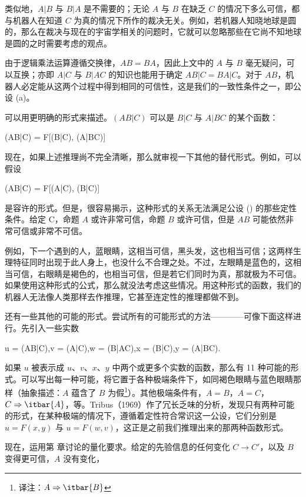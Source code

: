 类似地，$A|B$ 与 $B|A$ 是不需要的；无论 $A$ 与 $B$ 在缺乏 $C$ 的情况下多么可信，都与机器人在知道 $C$ 为真的情况下所作的裁决无关。例如，若机器人知晓地球是圆的，那么在裁决与现在的宇宙学相关的问题时，它就可以忽略那些在它尚不知地球是圆的之时需要考虑的观点。

由于逻辑乘法运算遵循交换律，$AB = BA$，因此上文中的 $A$ 与 $B$ 毫无疑问，可以互换；亦即 $A|C$ 与 $B|AC$ 的知识也能用于确定 $AB|C = BA|C$。对于 $AB$，机器人必定能从这两个过程中得到相同的可信性，这是我们的一致性条件之一，即公设 (a)。

可以用更明确的形式来描述。$(AB|C)$ 可以是 $B|C$ 与 $A|BC$ 的某个函数：

\startformula
(AB|C) = F[(B|C), (A|BC)]
\stopformula

现在，如果上述推理尚不完全清晰，那么就审视一下其他的替代形式。例如，可以假设

\placeformula
\startformula
(AB|C) = F[(A|C), (B|C)]
\stopformula

是容许的形式。但是，很容易揭示，这种形式的关系无法满足公设 () 的那些定性条件。给定 C，命题 $A$ 或许非常可信，命题 $B$ 或许可信，但是 $AB$ 可能依然非常可信或非常不可信。

例如，下一个遇到的人，蓝眼睛，这相当可信，黑头发，这也相当可信；这两样生理特征同时出现于此人身上，也没什么不合理之处。不过，左眼睛是蓝色的，这相当可信，右眼睛是褐色的，也相当可信，但是若它们同时为真，那就极为不可信。如果使用这种形式的公式，那么就没法考虑这些情况。用这种形式的函数，我们的机器人无法像人类那样去作推理，它甚至连定性的推理都做不到。

还有一些其他的可能的形式。尝试所有的可能形式的方法————可像下面这样进行。先引入一些实数

\placeformula
\startformula
u = (AB|C),\quad v = (A|C),\quad w = (B|AC),\quad x = (B|C),\quad y = (A|BC).
\stopformula

如果 $u$ 被表示成 $u$、$v$、$x$、$y$ 中两个或更多个实数的函数，那么有 11 种可能的形式。可以写出每一种可能，将它置于各种极端条件下，如同褐色眼睛与蓝色眼睛那样（抽象描述：$A$ 蕴含了 $B$ 为假\footnote{译注：$A\Rightarrow\itbar{B}$}）。其他极端条件有，$A = B$，$A = C$，$C\Rightarrow\itbar{A}$，等。Tribus（1969）作了冗长乏味的分析，发现只有两种可能的形式，在某种极端的情况下，遵循着定性符合常识这一公设，它们分别是 $u = F(x, y)$ 与 $u = F(w, v)$，这正是之前我们推理出来的那两种函数形式。

现在，运用第  章讨论的量化要求。给定的先验信息的任何变化 $C\rightarrow C'$，以及 $B$ 变得更可信，$A$ 没有变化，

